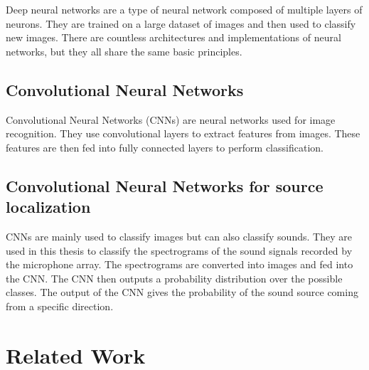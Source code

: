 Deep neural networks are a type of neural network composed of multiple layers of neurons. They are trained on a large dataset of images and then used to classify new images. There are countless architectures \cite{LIU201711} and implementations of neural networks, but they all share the same basic principles.



\subsection{Convolutional Neural Networks}

Convolutional Neural Networks (CNNs) are neural networks used for image recognition. They use convolutional layers to extract features from images. These features are then fed into fully connected layers to perform classification. 


\subsection{Convolutional Neural Networks for source localization}

CNNs are mainly used to classify images but can also classify sounds. They are used in this thesis to classify the spectrograms of the sound signals recorded by the microphone array. The spectrograms are converted into images and fed into the CNN. The CNN then outputs a probability distribution over the possible classes. The output of the CNN gives the probability of the sound source coming from a specific direction.

\section{Related Work}

\subsection{}

